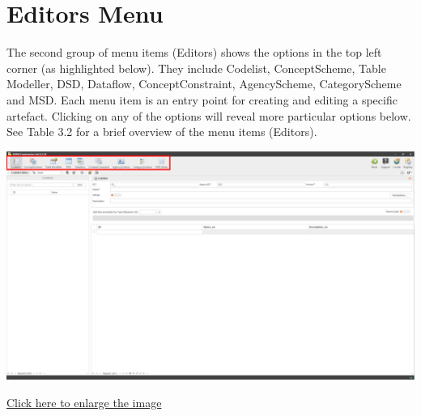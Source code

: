 \documentclass[
]{book}
\begin{document}
\hypertarget{editors-menu}{%
\section{Editors Menu}\label{editors-menu}}

The second group of menu items (Editors) shows the options in the top left corner (as highlighted below). They include Codelist, ConceptScheme, Table Modeller, DSD, Dataflow, ConceptConstraint, AgencyScheme, CategoryScheme and MSD. Each menu item is an entry point for creating and editing a specific artefact. Clicking on any of the options will reveal more particular options below. See Table 3.2 for a brief overview of the menu items (Editors).

\begin{center}\includegraphics[width=1\linewidth]{./images/image013} \end{center}

\href{images/image013.png}{Click here to enlarge the image}
\end{document}
